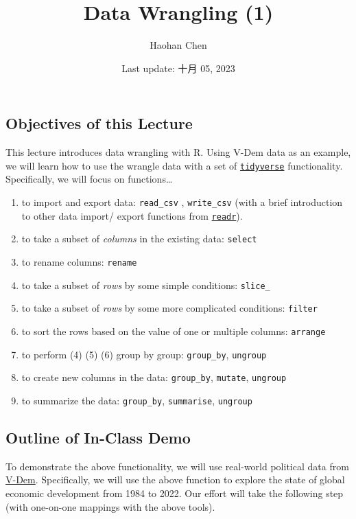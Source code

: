 \documentclass[
]{article}
\title{Data Wrangling (1)}
\author{Haohan Chen}
\date{Last update: 十月 05, 2023}
\begin{document}
\maketitle

\hypertarget{objectives-of-this-lecture}{%
\subsection{Objectives of this
Lecture}\label{objectives-of-this-lecture}}

This lecture introduces data wrangling with R. Using V-Dem data as an
example, we will learn how to use the wrangle data with a set of
\href{https://www.tidyverse.org/}{\texttt{tidyverse}} functionality.
Specifically, we will focus on functions\ldots{}

\begin{enumerate}
\def\labelenumi{\arabic{enumi}.}
\item
  to import and export data: \texttt{read\_csv} , \texttt{write\_csv}
  (with a brief introduction to other data import/ export functions from
  \href{https://readr.tidyverse.org/}{\texttt{readr}}).
\item
  to take a subset of \emph{columns} in the existing data:
  \texttt{select}
\item
  to rename columns: \texttt{rename}
\item
  to take a subset of \emph{rows} by some simple conditions:
  \texttt{slice\_}
\item
  to take a subset of \emph{rows} by some more complicated conditions:
  \texttt{filter}
\item
  to sort the rows based on the value of one or multiple columns:
  \texttt{arrange}
\item
  to perform (4) (5) (6) group by group: \texttt{group\_by},
  \texttt{ungroup}
\item
  to create new columns in the data: \texttt{group\_by},
  \texttt{mutate}, \texttt{ungroup}
\item
  to summarize the data: \texttt{group\_by}, \texttt{summarise},
  \texttt{ungroup}
\end{enumerate}

\hypertarget{outline-of-in-class-demo}{%
\subsection{Outline of In-Class Demo}\label{outline-of-in-class-demo}}

To demonstrate the above functionality, we will use real-world political
data from \href{https://v-dem.net/}{V-Dem}. Specifically, we will use
the above function to explore the state of global economic development
from 1984 to 2022. Our effort will take the following step (with
one-on-one mappings with the above tools).
\end{document}
